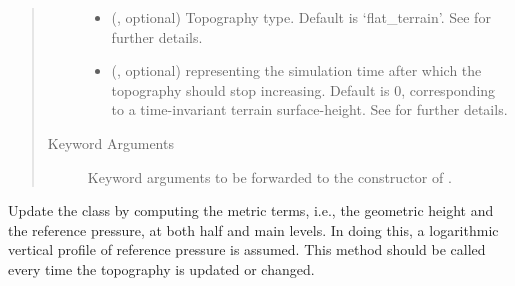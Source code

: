 \documentclass[letterpaper,10pt,english]{sphinxmanual}
\begin{document}
\begin{fulllineitems}
\begin{fulllineitems}
\begin{quote}
\begin{description}
\begin{itemize}
\item {} 
 (, optional) \textendash{} Topography type. Default is ‘flat\_terrain’. See {\hyperref[\detokenize{api:module-tasmania.grids.topography}]{}} for further details.

\item {} 
 (, optional) \textendash{}  representing the simulation time after which the topography should stop
increasing. Default is 0, corresponding to a time-invariant terrain surface-height.
See {\hyperref[\detokenize{api:module-tasmania.grids.topography}]{}} for further details.

\end{itemize}

\item[{Keyword Arguments}] \leavevmode
{} \textendash{} Keyword arguments to be forwarded to the constructor of {\hyperref[\detokenize{api:tasmania.grids.topography.Topography1d}]{}}.

\end{description}\end{quote}

\end{fulllineitems}


\begin{fulllineitems}
\label{\detokenize{api:tasmania.grids.sigma.Sigma2d._update_metric_terms}}
Update the class by computing the metric terms, i.e., the geometric height and the reference pressure,
at both half and main levels. In doing this, a logarithmic vertical profile of reference pressure is assumed.
This method should be called every time the topography is updated or changed.

\end{fulllineitems}



\end{fulllineitems}
\end{document}
